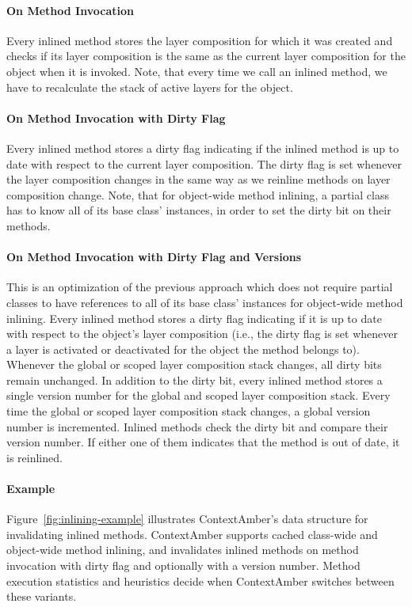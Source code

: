 \documentclass[english,paper=a4,twocolumn=true,DIV=calc,fontsize=9pt]{scrartcl}
\begin{document}
\paragraph{On Method Invocation}
Every inlined method stores the layer composition for which it was created and checks if its layer composition is the same as the current layer composition for the object when it is invoked. Note, that every time we call an inlined method, we have to recalculate the stack of active layers for the object.

\paragraph{On Method Invocation with Dirty Flag}
Every inlined method stores a dirty flag indicating if the inlined method is up to date with respect to the current layer composition. The dirty flag is set whenever the layer composition changes in the same way as we reinline methods on layer composition change. Note, that for object-wide method inlining, a partial class has to know all of its base class' instances, in order to set the dirty bit on their methods.

\paragraph{On Method Invocation with Dirty Flag and Versions}
This is an optimization of the previous approach which does not require partial classes to have references to all of its base class' instances for object-wide method inlining. Every inlined method stores a dirty flag indicating if it is up to date with respect to the object's layer composition (i.e., the dirty flag is set whenever a layer is activated or deactivated for the object the method belongs to). Whenever the global or scoped layer composition stack changes, all dirty bits remain unchanged. In addition to the dirty bit, every inlined method stores a single version number for the global and scoped layer composition stack. Every time the global or scoped layer composition stack changes, a global version number is incremented. Inlined methods check the dirty bit and compare their version number. If either one of them indicates that the method is out of date, it is reinlined.

\paragraph{Example}
Figure~\ref{fig:inlining-example} illustrates ContextAmber's data structure for invalidating inlined methods. ContextAmber supports cached class-wide and object-wide method inlining, and invalidates inlined methods on method invocation with dirty flag and optionally with a version number. Method execution statistics and heuristics decide when ContextAmber switches between these variants.
\end{document}
